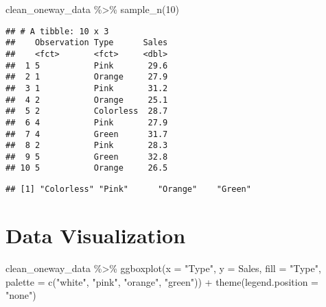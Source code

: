 \documentclass[
]{book}
\newenvironment{Shaded}{\begin{snugshade}}{\end{snugshade}}
\newcommand{\AttributeTok}[1]{\textcolor[rgb]{0.77,0.63,0.00}{#1}}
\newcommand{\DecValTok}[1]{\textcolor[rgb]{0.00,0.00,0.81}{#1}}
\newcommand{\FunctionTok}[1]{\textcolor[rgb]{0.00,0.00,0.00}{#1}}
\newcommand{\NormalTok}[1]{#1}
\newcommand{\SpecialCharTok}[1]{\textcolor[rgb]{0.00,0.00,0.00}{#1}}
\newcommand{\StringTok}[1]{\textcolor[rgb]{0.31,0.60,0.02}{#1}}
\begin{document}
\begin{Shaded}
\begin{Highlighting}[]
\NormalTok{clean\_oneway\_data }\SpecialCharTok{\%\textgreater{}\%} 
  \FunctionTok{sample\_n}\NormalTok{(}\DecValTok{10}\NormalTok{)}
\end{Highlighting}
\end{Shaded}

\begin{verbatim}
## # A tibble: 10 x 3
##    Observation Type      Sales
##    <fct>       <fct>     <dbl>
##  1 5           Pink       29.6
##  2 1           Orange     27.9
##  3 1           Pink       31.2
##  4 2           Orange     25.1
##  5 2           Colorless  28.7
##  6 4           Pink       27.9
##  7 4           Green      31.7
##  8 2           Pink       28.3
##  9 5           Green      32.8
## 10 5           Orange     26.5
\end{verbatim}

\begin{Shaded}
\end{Shaded}

\begin{verbatim}
## [1] "Colorless" "Pink"      "Orange"    "Green"
\end{verbatim}

\hypertarget{data-visualization}{%
\chapter{Data Visualization}\label{data-visualization}}

\begin{Shaded}
\begin{Highlighting}[]
\NormalTok{clean\_oneway\_data }\SpecialCharTok{\%\textgreater{}\%} 
  \FunctionTok{ggboxplot}\NormalTok{(}\AttributeTok{x =} \StringTok{"Type"}\NormalTok{, }\AttributeTok{y =} \StringTok{\textquotesingle{}Sales\textquotesingle{}}\NormalTok{,}
            \AttributeTok{fill =} \StringTok{"Type"}\NormalTok{,}
            \AttributeTok{palette =} \FunctionTok{c}\NormalTok{(}\StringTok{"white"}\NormalTok{, }\StringTok{"pink"}\NormalTok{, }\StringTok{"orange"}\NormalTok{, }\StringTok{"green"}\NormalTok{)) }\SpecialCharTok{+} 
  \FunctionTok{theme}\NormalTok{(}\AttributeTok{legend.position =} \StringTok{"none"}\NormalTok{)}
\end{Highlighting}
\end{Shaded}
\end{document}
